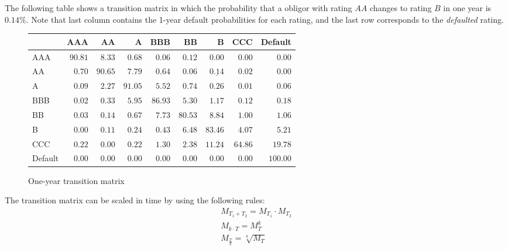 \documentclass[11pt,fleqn]{book} %
\begin{document}
\begin{example}
The following table shows a transition matrix in which the probability that 
a obligor with rating $AA$ changes to rating $B$ in one year is $0.14\%$.
Note that last column contains the 1-year default probabilities for each 
rating, and the last row corresponds to the \emph{defaulted} rating.

\begin{figure}[!hb]
\begin{center}
\begin{tabular}[]{l|rrrrrrrr}
        &      AAA &       AA &        A &      BBB &       BB &        B &      CCC &  Default \\
\hline
AAA     &  $90.81$ &   $8.33$ &   $0.68$ &   $0.06$ &   $0.12$ &   $0.00$ &   $0.00$ &   $0.00$ \\
 AA     &   $0.70$ &  $90.65$ &   $7.79$ &   $0.64$ &   $0.06$ &   $\underline{0.14}$ &   $0.02$ &   $0.00$ \\
  A     &   $0.09$ &   $2.27$ &  $91.05$ &   $5.52$ &   $0.74$ &   $0.26$ &   $0.01$ &   $0.06$ \\
BBB     &   $0.02$ &   $0.33$ &   $5.95$ &  $86.93$ &   $5.30$ &   $1.17$ &   $0.12$ &   $0.18$ \\
 BB     &   $0.03$ &   $0.14$ &   $0.67$ &   $7.73$ &  $80.53$ &   $8.84$ &   $1.00$ &   $1.06$ \\
  B     &   $0.00$ &   $0.11$ &   $0.24$ &   $0.43$ &   $6.48$ &  $83.46$ &   $4.07$ &   $5.21$ \\
CCC     &   $0.22$ &   $0.00$ &   $0.22$ &   $1.30$ &   $2.38$ &  $11.24$ &  $64.86$ &  $19.78$ \\
Default &   $0.00$ &   $0.00$ &   $0.00$ &   $0.00$ &   $0.00$ &   $0.00$ &   $0.00$ & $100.00$ \\
\end{tabular}
\caption{One-year transition matrix}
\label{tmatrix1}
\end{center}
\end{figure}
\end{example}

\begin{proposition}
The transition matrix can be scaled in time by using the following rules:
\begin{equation}
\label{sttm}
\begin{array}{l}
M_{T_1+T_2} = M_{T_1} \cdot M_{T_2} \nonumber \\
M_{k \cdot T} = M_{T}^k \nonumber \\
M_{\frac{T}{k}} = \sqrt[k]{M_{T}} \nonumber
\end{array}
\end{equation}
\end{proposition}
\end{document}
